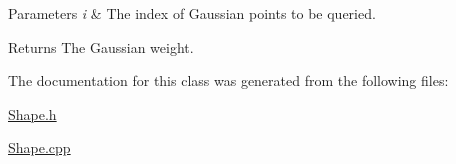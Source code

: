 \begin{DoxyParams}{Parameters}
{\em i} & The index of Gaussian points to be queried. \\
\hline
\end{DoxyParams}
\begin{DoxyReturn}{Returns}
The Gaussian weight. 
\end{DoxyReturn}


The documentation for this class was generated from the following files\+:\begin{DoxyCompactItemize}
\item 
\mbox{\hyperlink{_shape_8h}{Shape.\+h}}\item 
\mbox{\hyperlink{_shape_8cpp}{Shape.\+cpp}}\end{DoxyCompactItemize}
